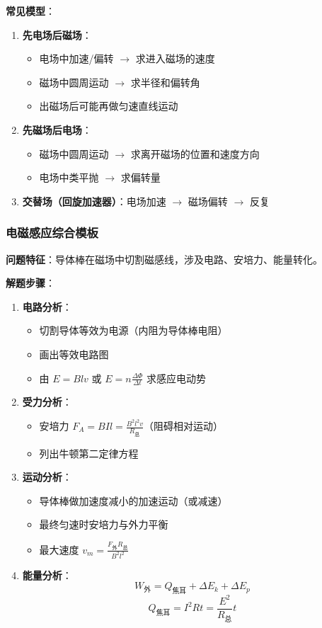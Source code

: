 \textbf{常见模型}：
\begin{enumerate}
  \item \textbf{先电场后磁场}：
    \begin{itemize}
      \item 电场中加速/偏转 $\to$ 求进入磁场的速度
      \item 磁场中圆周运动 $\to$ 求半径和偏转角
      \item 出磁场后可能再做匀速直线运动
    \end{itemize}
  \item \textbf{先磁场后电场}：
    \begin{itemize}
      \item 磁场中圆周运动 $\to$ 求离开磁场的位置和速度方向
      \item 电场中类平抛 $\to$ 求偏转量
    \end{itemize}
  \item \textbf{交替场（回旋加速器）}：电场加速 $\to$ 磁场偏转 $\to$ 反复
\end{enumerate}

\subsubsection{电磁感应综合模板}

\textbf{问题特征}：导体棒在磁场中切割磁感线，涉及电路、安培力、能量转化。

\textbf{解题步骤}：
\begin{enumerate}
  \item \textbf{电路分析}：
    \begin{itemize}
      \item 切割导体等效为电源（内阻为导体棒电阻）
      \item 画出等效电路图
      \item 由 $E = Blv$ 或 $E = n\frac{\Delta\Phi}{\Delta t}$ 求感应电动势
    \end{itemize}
  \item \textbf{受力分析}：
    \begin{itemize}
      \item 安培力 $F_A = BIl = \frac{B^2l^2v}{R_{\text{总}}}$（阻碍相对运动）
      \item 列出牛顿第二定律方程
    \end{itemize}
  \item \textbf{运动分析}：
    \begin{itemize}
      \item 导体棒做加速度减小的加速运动（或减速）
      \item 最终匀速时安培力与外力平衡
      \item 最大速度 $v_m = \frac{F_{\text{外}}R_{\text{总}}}{B^2l^2}$
    \end{itemize}
  \item \textbf{能量分析}：
    \[
    W_{\text{外}} = Q_{\text{焦耳}} + \Delta E_k + \Delta E_p
    \]
    \[
    Q_{\text{焦耳}} = I^2Rt = \frac{E^2}{R_{\text{总}}}t
    \]
\end{enumerate}

